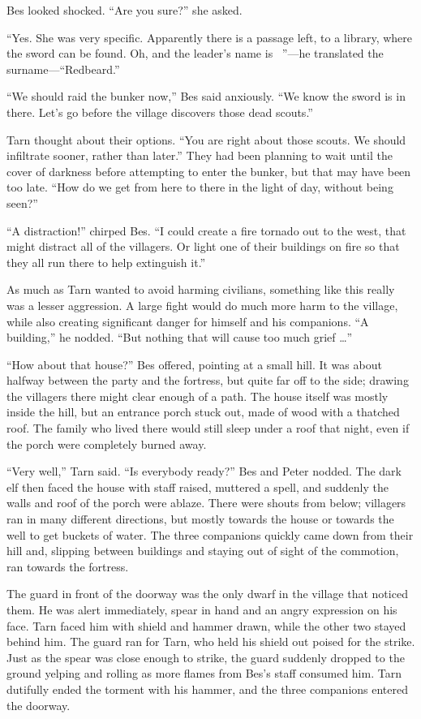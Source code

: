 Bes looked shocked.  ``Are you sure?'' she asked.

``Yes.  She was very specific.  Apparently there is a passage left, to a library, where the sword can be found.  Oh, and the leader's name is \mothzam\ \driktur''---he translated the surname---``Redbeard.''

``We should raid the bunker now,'' Bes said anxiously.  ``We know the sword is in there.  Let's go before the village discovers those dead scouts.''

Tarn thought about their options.  ``You are right about those scouts.  We should infiltrate sooner, rather than later.''  They had been planning to wait until the cover of darkness before attempting to enter the bunker, but that may have been too late.  ``How do we get from here to there in the light of day, without being seen?''

``A distraction!'' chirped Bes.  ``I could create a fire tornado out to the west, that might distract all of the villagers.  Or light one of their buildings on fire so that they all run there to help extinguish it.''

As much as Tarn wanted to avoid harming civilians, something like this really was a lesser aggression.  A large fight would do much more harm to the village, while also creating significant danger for himself and his companions.  ``A building,'' he nodded.  ``But nothing that will cause too much grief \ldots''

``How about that house?'' Bes offered, pointing at a small hill.  It was about halfway between the party and the fortress, but quite far off to the side; drawing the villagers there might clear enough of a path.  The house itself was mostly inside the hill, but an entrance porch stuck out, made of wood with a thatched roof.  The family who lived there would still sleep under a roof that night, even if the porch were completely burned away.

``Very well,'' Tarn said. ``Is everybody ready?''  Bes and Peter nodded.  The dark elf then faced the house with staff raised, muttered a spell, and suddenly the walls and roof of the porch were ablaze.  There were shouts from below; villagers ran in many different directions, but mostly towards the house or towards the well to get buckets of water.  The three companions quickly came down from their hill and, slipping between buildings and staying out of sight of the commotion, ran towards the fortress.

The guard in front of the doorway was the only dwarf in the village that noticed them.  He was alert immediately, spear in hand and an angry expression on his face.  Tarn faced him with shield and hammer drawn, while the other two stayed behind him.  The guard ran for Tarn, who held his shield out poised for the strike.  Just as the spear was close enough to strike, the guard suddenly dropped to the ground yelping and rolling as more flames from Bes's staff consumed him.  Tarn dutifully ended the torment with his hammer, and the three companions entered the doorway.